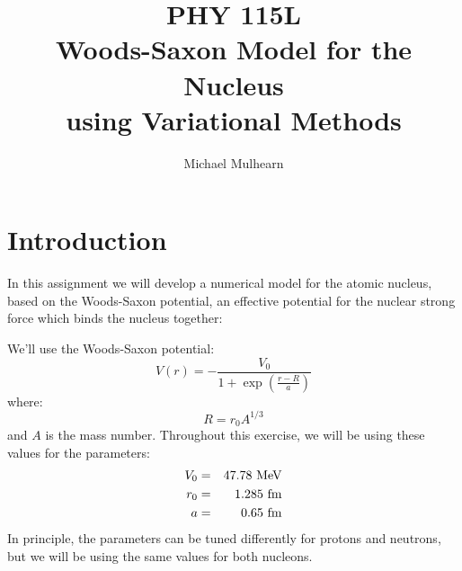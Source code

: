 \documentclass[12pt]{article}
\begin{document}
\newcommand{\ihbar}{\ensuremath{i \hbar}}
\newcommand{\Pss}{\ensuremath{\Psi^*}}
\newcommand{\dPsidt}{\ensuremath{ \frac{\partial \Psi}{\partial t} }}
\newcommand{\dPsidx}{\ensuremath{ \frac{\partial \Psi}{\partial x} }}
\newcommand{\ddPsidx}{\ensuremath{ \frac{\partial^2 \Psi}{\partial x^2} }}
\newcommand{\dPssdt}{\ensuremath{ \frac{\partial \Psi^*}{\partial t} }}
\newcommand{\dPssdx}{\ensuremath{ \frac{\partial \Psi^*}{\partial x} }}
\newcommand{\ddPssdx}{\ensuremath{ \frac{\partial^2 \Psi^*}{\partial x^2} }}

\newcommand{\dphidt}{\ensuremath{ \frac{d \phi}{dt} }}
\newcommand{\dpsidx}{\ensuremath{ \frac{d \psi}{dx} }}
\newcommand{\ddpsidx}{\ensuremath{ \frac{d^2 \psi}{dx^2} }}


\title{PHY 115L \\ Woods-Saxon Model for the Nucleus \\ using Variational Methods }
\author{Michael Mulhearn}

\maketitle

\section{Introduction}




In this assignment we will develop a numerical model for the atomic
nucleus, based on the Woods-Saxon potential, an effective potential
for the nuclear strong force which binds the nucleus together:

We'll use the Woods-Saxon potential:
\begin{equation}
V(r) = -\frac{V_0}{1 + \exp\left( \frac{r-R}{a} \right)}
\end{equation}
where:
\begin{equation}
R = r_0 A^{1/3} 
\end{equation}
and $A$ is the mass number.  Throughout this exercise, we will be using these values for the parameters:
\begin{eqnarray*}
V_0 &=& 47.78 ~ {\rm MeV} \\
r_0 &=& 1.285 ~ {\rm fm}\\
a   &=& 0.65 ~ {\rm fm}\\
\end{eqnarray*}
In principle, the parameters can be tuned differently for protons and
neutrons, but we will be using the same values for both nucleons.
\end{document}
